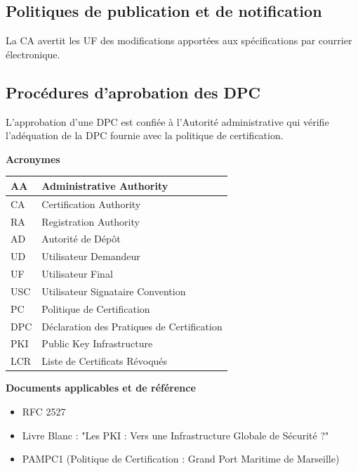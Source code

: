 \documentclass[a4paper,11pt,french]{book}
\begin{document}
\subsection{Politiques de publication et de notification}
La CA avertit les UF des modifications apportées aux spécifications par courrier électronique.

\subsection{Procédures d'aprobation des DPC}
L’approbation d’une DPC est confiée à l’Autorité administrative qui vérifie l’adéquation de la DPC fournie avec la politique de certification.

\newpage
\textbf {Acronymes}


\begin{tabular}{|l|p{10cm}|}
\hline
AA  & Administrative Authority
\\
\hline
CA & Certification Authority
\\
\hline
RA  & Registration Authority
\\
\hline
AD  & Autorité de Dépôt
\\
\hline
UD  & Utilisateur Demandeur 
\\
\hline
UF & Utilisateur Final
\\
\hline
USC &  Utilisateur Signataire Convention
\\
\hline
PC & Politique de Certification
\\
\hline
DPC & Déclaration des Pratiques de Certification
\\
\hline
PKI & Public Key Infrastructure
\\
\hline
LCR & Liste de Certificats Révoqués
\\
\hline

\end{tabular}

\newpage
\textbf {Documents applicables et de référence}
\begin{itemize}
\item RFC 2527
\item Livre Blanc : "Les PKI : Vers une Infrastructure
Globale de Sécurité ?"
\item PAMPC1 (Politique de Certification : Grand Port Maritime de Marseille)
\end{itemize}
\end{document}
